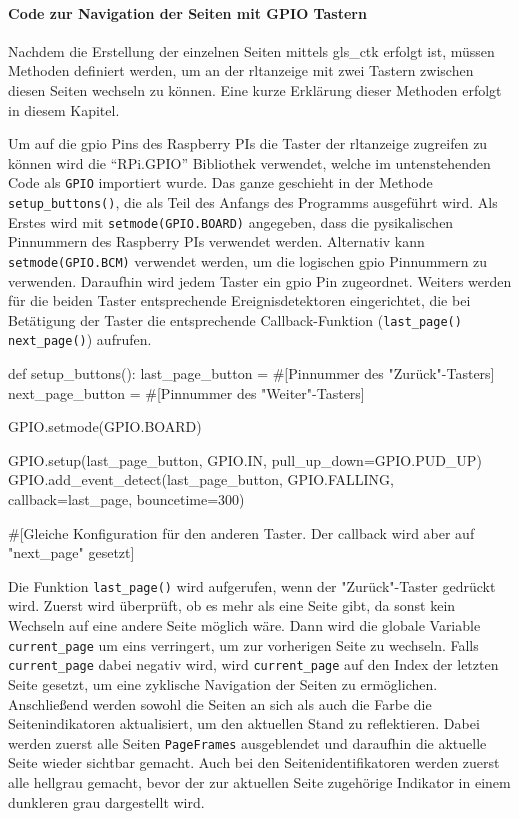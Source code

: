 \paragraph{Code zur Navigation der Seiten mit GPIO Tastern}

Nachdem die Erstellung der einzelnen Seiten mittels \gls{gls_ctk} erfolgt ist, müssen Methoden definiert werden, um an der \acs{rltanzeige} mit zwei Tastern zwischen diesen Seiten wechseln zu können. Eine kurze Erklärung dieser Methoden erfolgt in diesem Kapitel.

Um auf die \ac{gpio} Pins des Raspberry PIs \bzw die Taster der \acs{rltanzeige} zugreifen zu können wird die \enquote{RPi.GPIO} Bibliothek verwendet, welche im untenstehenden Code als \lstinline{GPIO} importiert wurde. Das ganze geschieht in der Methode \lstinline{setup_buttons()}, die als Teil des Anfangs des Programms ausgeführt wird.
Als Erstes wird mit \lstinline{setmode(GPIO.BOARD)} angegeben, dass die pysikalischen Pinnummern des Raspberry PIs verwendet werden. Alternativ kann \lstinline{setmode(GPIO.BCM)} verwendet werden, um die logischen \ac{gpio} Pinnummern zu verwenden. Daraufhin wird jedem Taster ein \ac{gpio} Pin zugeordnet. Weiters werden für die beiden Taster entsprechende Ereignisdetektoren eingerichtet, die bei Betätigung der Taster die entsprechende Callback-Funktion (\lstinline{last_page()} \bzw \lstinline{next_page()}) aufrufen.

\begin{pythoncode}
def setup_buttons():
    last_page_button = #[Pinnummer des "Zurück"-Tasters]
    next_page_button = #[Pinnummer des "Weiter"-Tasters]

    GPIO.setmode(GPIO.BOARD)
    
    GPIO.setup(last_page_button, GPIO.IN, pull_up_down=GPIO.PUD_UP)
    GPIO.add_event_detect(last_page_button, GPIO.FALLING, callback=last_page, bouncetime=300)

    #[Gleiche Konfiguration für den anderen Taster. Der callback wird aber auf "next_page" gesetzt]
\end{pythoncode}

Die Funktion \lstinline{last_page()} wird aufgerufen, wenn der "Zurück"-Taster gedrückt wird. Zuerst wird überprüft, ob es mehr als eine Seite gibt, da sonst kein Wechseln auf eine andere Seite möglich wäre. Dann wird die globale Variable \lstinline{current_page} um eins verringert, um zur vorherigen Seite zu wechseln. Falls \lstinline{current_page} dabei negativ wird, wird \lstinline{current_page} auf den Index der letzten Seite gesetzt, um eine zyklische Navigation der Seiten zu ermöglichen. Anschließend werden sowohl  die Seiten an sich als auch die Farbe die Seitenindikatoren aktualisiert, um den aktuellen Stand zu reflektieren. Dabei werden zuerst alle Seiten \bzw \lstinline{PageFrames} ausgeblendet und daraufhin die aktuelle Seite wieder sichtbar gemacht. Auch bei den Seitenidentifikatoren werden zuerst alle hellgrau gemacht, bevor der zur aktuellen Seite zugehörige Indikator in einem dunkleren grau dargestellt wird.

